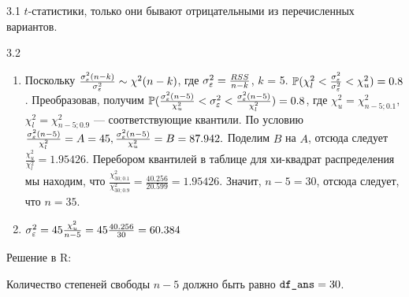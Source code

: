 \protect \hypertarget {soln:3.1}{}
\begin{solution}{{3.1}}
$t$-статистики, только они бывают отрицательными из перечисленных вариантов.
\end{solution}
\protect \hypertarget {soln:3.2}{}
\begin{solution}{{3.2}}
\begin{enumerate}
\item Поскольку $\frac{\sigma_{\varepsilon}^2(n-k)}{\sigma_{\varepsilon}^2} \sim \chi ^2(n-k)$, где $\sigma_{\varepsilon}^2 = \frac{RSS}{n-k}$, $k$ = 5. $\mathbb{P}(\chi_{l}^2 < \frac{\sigma_{\varepsilon}^2}{\sigma_{\varepsilon}^2} < \chi_{u}^2) = 0.8$. Преобразовав, получим $\mathbb{P}(\frac{\sigma_{\varepsilon}^2(n-5)}{\chi_{u}^2} < \sigma_{\varepsilon}^2 < \frac{\sigma_{\varepsilon}^2(n-5)}{\chi_{l}^2}) = 0.8$, где $\chi_{u}^2 = \chi_{n-5; 0.1} ^2$, $\chi_{l}^2 = \chi_{n-5; 0.9} ^2$ — соответствующие квантили. По условию $\frac{\sigma_{\varepsilon}^2(n-5)}{\chi_{l}^2} = A = 45, \frac{\sigma_{\varepsilon}^2(n-5)}{\chi_{u}^2} = B = 87.942.$ Поделим $B$ на $A$, отсюда следует $\frac{\chi_{u}^2}{\chi_{l}^2} = 1.95426.$ Перебором квантилей в таблице для хи-квадрат распределения мы находим, что $\frac{\chi_{30; 0.1}^2}{\chi_{30; 0.9}^2} = \frac{40.256}{20.599} = 1.95426.$ Значит, $n - 5 = 30$, отсюда следует, что $n = 35.$
\item $\sigma_{\varepsilon}^2 = 45 \frac{\chi_{u}^2}{n-5} = 45 \frac{40.256}{30} = 60.384$
\end{enumerate}

Решение в R:
\begin{knitrout}
\color{fgcolor}\begin{kframe}
\begin{alltt}
 \hlkwb{<-} \hlopt{:}
 \hlkwb{<-} \hlstd{(}
 \hlkwb{<-} \hlstd{(}
 \hlkwb{<-}  \hlopt{/} 
 \hlkwb{<-}  \hlopt{/} 
 \hlkwb{<-}  \hlopt{-} \hlopt{^}
 \hlkwb{<-} \hlstd{df[} \hlopt{==} \hlstd{(penalty))]}
\end{alltt}
\end{kframe}
\end{knitrout}
Количество степеней свободы $n-5$ должно быть равно $\verb|df_ans|=
30
$.

\end{solution}
\protect \hypertarget {soln:3.3}{}
